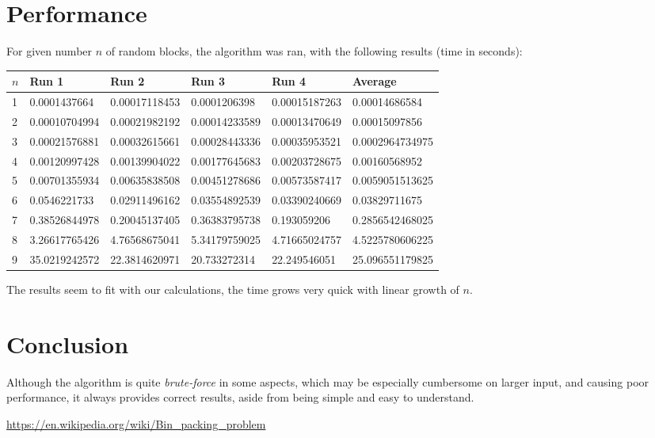 \section{Performance}
For given number $n$ of random blocks, the algorithm was ran, with the following
results (time in seconds):

\begin{center}
    \begin{tabular}{| l | l | l | l | l | l |}
    \hline
$n$ & Run 1 & Run 2 & Run 3 & Run 4 & Average \\
    \hline
1 & 0.0001437664 & 0.00017118453 & 0.0001206398 & 0.00015187263 & 0.00014686584 \\
2 & 0.00010704994 & 0.00021982192 & 0.00014233589 & 0.00013470649 &
0.00015097856 \\
3 & 0.00021576881 & 0.00032615661 & 0.00028443336 & 0.00035953521 &
0.0002964734975 \\
4 & 0.00120997428 & 0.00139904022 & 0.00177645683 & 0.00203728675 &
0.00160568952 \\
5 & 0.00701355934 & 0.00635838508 & 0.00451278686 & 0.00573587417 &
0.0059051513625 \\
6 & 0.0546221733 & 0.02911496162 & 0.03554892539 & 0.03390240669 & 0.03829711675 \\
7 & 0.38526844978 & 0.20045137405 & 0.36383795738 & 0.193059206 &
0.2856542468025 \\
8 & 3.26617765426 & 4.76568675041 & 5.34179759025 & 4.71665024757 &
4.5225780606225 \\
9 & 35.0219242572 & 22.3814620971 & 20.733272314 & 22.249546051 &
25.096551179825 \\
    \hline
    \end{tabular}
\end{center}

The results seem to fit with our calculations,
the time grows very quick with linear growth of $n$.

\section{Conclusion}
Although the algorithm is quite \textit{brute-force} in some aspects,
which may be especially cumbersome on larger input, and causing poor performance,
it always provides correct results, aside from
being simple and easy to understand.

\newpage
\begin{thebibliography}{9}
	\url{https://en.wikipedia.org/wiki/Bin_packing_problem}
\end{thebibliography}


